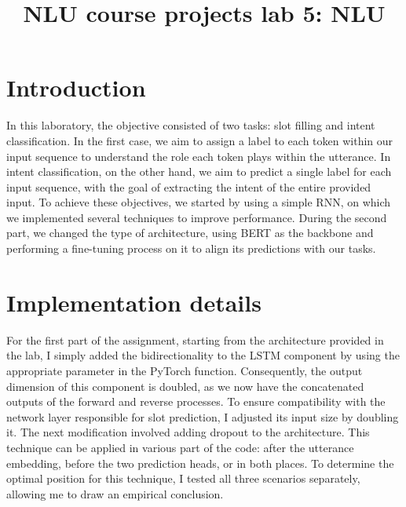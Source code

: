 \documentclass[a4paper]{article}
\title{NLU course projects lab 5: NLU}
\begin{document}
\maketitle

\section{Introduction}
In this laboratory, the objective consisted of two tasks: slot filling and intent classification. In the first case, we aim to assign a label to each token within our input sequence to understand the role each token plays within the utterance. In intent classification, on the other hand, we aim to predict a single label for each input sequence, with the goal of extracting the intent of the entire provided input.
To achieve these objectives, we started by using a simple RNN, on which we implemented several techniques to improve performance.
During the second part, we changed the type of architecture, using BERT as the backbone and performing a fine-tuning process on it to align its predictions with our tasks.


\section{Implementation details}
For the first part of the assignment, starting from the architecture provided in the lab, I simply added the bidirectionality to the LSTM component by using the appropriate parameter in the PyTorch function.
Consequently, the output dimension of this component is doubled, as we now have the concatenated outputs of the forward and reverse processes. To ensure compatibility with the network layer responsible for slot prediction, I adjusted its input size by doubling it.
The next modification involved adding dropout to the architecture.
This technique can be applied in various part of the code: after the utterance embedding, before the two prediction heads, or in both places. To determine the optimal position for this technique, I tested all three scenarios separately, allowing me to draw an empirical conclusion.
\newline
\end{document}
